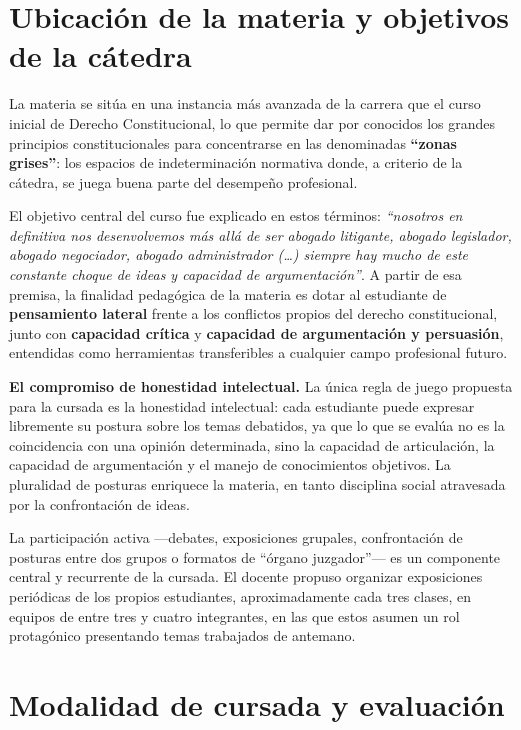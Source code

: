 \documentclass[12pt,oneside]{book}
\begin{document}
\section{Ubicación de la materia y objetivos de la cátedra}

La materia se sitúa en una instancia más avanzada de la carrera que el curso inicial de Derecho Constitucional, lo que permite dar por conocidos los grandes principios constitucionales para concentrarse en las denominadas \textbf{``zonas grises''}: los espacios de indeterminación normativa donde, a criterio de la cátedra, se juega buena parte del desempeño profesional.

El objetivo central del curso fue explicado en estos términos: \textit{``nosotros en definitiva nos desenvolvemos más allá de ser abogado litigante, abogado legislador, abogado negociador, abogado administrador (\ldots) siempre hay mucho de este constante choque de ideas y capacidad de argumentación''}. A partir de esa premisa, la finalidad pedagógica de la materia es dotar al estudiante de \textbf{pensamiento lateral} frente a los conflictos propios del derecho constitucional, junto con \textbf{capacidad crítica} y \textbf{capacidad de argumentación y persuasión}, entendidas como herramientas transferibles a cualquier campo profesional futuro.

\begin{important}
\textbf{El compromiso de honestidad intelectual.} La única regla de juego propuesta para la cursada es la honestidad intelectual: cada estudiante puede expresar libremente su postura sobre los temas debatidos, ya que lo que se evalúa no es la coincidencia con una opinión determinada, sino la capacidad de articulación, la capacidad de argumentación y el manejo de conocimientos objetivos. La pluralidad de posturas enriquece la materia, en tanto disciplina social atravesada por la confrontación de ideas.
\end{important}

La participación activa ---debates, exposiciones grupales, confrontación de posturas entre dos grupos o formatos de ``órgano juzgador''--- es un componente central y recurrente de la cursada. El docente propuso organizar exposiciones periódicas de los propios estudiantes, aproximadamente cada tres clases, en equipos de entre tres y cuatro integrantes, en las que estos asumen un rol protagónico presentando temas trabajados de antemano.

\section{Modalidad de cursada y evaluación}
\end{document}
